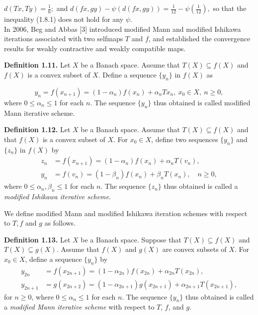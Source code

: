 \documentclass[11]{article}
\numberwithin{equation}{definition}
\begin{document}
\(d(Tx,Ty)=\frac{1}{6};\) and \(d(fx,gy)-\psi(d(fx,gy))=\frac{1}{12}-\psi(\frac{1}{12}),\) so that the inequality (1.8.1) does not hold for any \(\psi\).\\
In 2006, Beg and Abbas [3] introduced modified Mann and modified Ishikawa iterations associated with two selfmaps \(T\) and \(f\), and established the convergence results for weakly contractive and weakly compatible maps.

\textbf{Definition 1.11.} Let \(X\) be a Banach space. Assume that \(T(X)\subseteq f(X)\) and \(f(X)\) is a convex subset of \(X\). Define a sequence \(\{y_{n}\}\) in \(f(X)\) as

\[
y_{n}=f(x_{n+1})=(1-\alpha_{n})f(x_{n})+\alpha_{n}Tx_{n},\ x_{0}\in X,\ n\geq 0, \tag{1.11.1}
\]
where \(0\leq\alpha_{n}\leq 1\) for each \(n\). The sequence \(\{y_{n}\}\) thus obtained is called modified Mann iterative scheme.


\textbf{Definition 1.12.} 
Let \(X\) be a Banach space. Assume that \(T(X) \subseteq f(X)\) and that \(f(X)\) is a convex subset of \(X\). 
For \(x_{0} \in X\), define two sequences \(\{y_{n}\}\) and \(\{z_{n}\}\) in \(f(X)\) by
\begin{align}
z_{n} &= f(x_{n+1}) = (1 - \alpha_{n}) f(x_{n}) + \alpha_{n} T(v_{n}), \nonumber\\
y_{n} &= f(v_{n}) = (1 - \beta_{n}) f(x_{n}) + \beta_{n} T(x_{n}), \quad n \ge 0, \tag{1.12.1}
\end{align}
where \(0 \le \alpha_{n}, \beta_{n} \le 1\) for each \(n\). 
The sequence \(\{z_{n}\}\) thus obtained is called a \emph{modified Ishikawa iterative scheme}.


We define modified Mann and modified Ishikawa iteration schemes with respect to \(T,f\) and \(g\) as follows.

\textbf{Definition 1.13.} 
Let \(X\) be a Banach space. Suppose that 
\(T(X) \subseteq f(X)\) and \(T(X) \subseteq g(X)\). 
Assume that \(f(X)\) and \(g(X)\) are convex subsets of \(X\). 
For \(x_{0} \in X\), define a sequence \(\{y_{n}\}\) by
\begin{align}
y_{2n}   &= f(x_{2n+1})   = (1 - \alpha_{2n})f(x_{2n})   + \alpha_{2n}T(x_{2n}), \nonumber\\
y_{2n+1} &= g(x_{2n+2})   = (1 - \alpha_{2n+1})g(x_{2n+1}) + \alpha_{2n+1}T(x_{2n+1}), \tag{1.13.1}
\end{align}
for \(n \ge 0\), where \(0 \le \alpha_{n} \le 1\) for each \(n\).  
The sequence \(\{y_{n}\}\) thus obtained is called a \emph{modified Mann iterative scheme} with respect to \(T\), \(f\), and \(g\).
\end{document}
